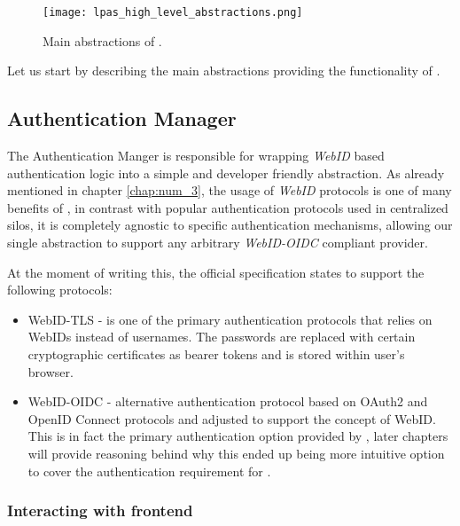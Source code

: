 \begin{figure}[h]
\centering
\texttt{[image: lpas\_high\_level\_abstractions.png]}
\caption{Main abstractions of \lpas.}
\label{fig:lpas_high_level_abstractions}
\end{figure}

Let us start by describing the main abstractions providing the functionality of \lpas{}.

\subsection{Authentication Manager}

The Authentication Manger is responsible for wrapping \solid{} \textit{WebID} based authentication logic into a simple and developer friendly abstraction. As already mentioned in chapter \ref{chap:num_3}, the usage of \textit{WebID} protocols is one of many benefits of \solid{}, in contrast with popular authentication protocols used in centralized silos, it is completely agnostic to specific authentication mechanisms, allowing our single abstraction to support any arbitrary \textit{WebID-OIDC} compliant \solid{} provider. 

At the moment of writing this, the official \solid{} specification states to support the following protocols:
\begin{itemize}
\item WebID-TLS  - is one of the primary authentication protocols that relies on WebIDs instead of usernames. The passwords are replaced with certain cryptographic certificates as bearer tokens and is stored within user's browser.
\item WebID-OIDC - alternative authentication protocol based on OAuth2 and OpenID Connect protocols and adjusted to support the concept of WebID. This is in fact the primary authentication option provided by \lpas{}, later chapters will provide reasoning behind why this ended up being more intuitive option to cover the authentication requirement for \lpa{}.   
\end{itemize}

\subsubsection{Interacting with frontend}

